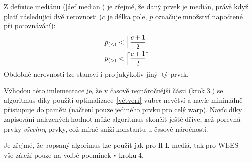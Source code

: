     Z definice mediánu (\ref{def median}) je zřejmé, že daný prvek je medián, právě když platí následující dvě nerovnosti ($c$ je délka pole, $p$ označuje množství napočtené při porovnávání):
    \begin{align}
      p_{(<)} < \Big\lfloor\frac{c+1}{2}\Big\rfloor \notag \\
      p_{(>)} < \Big\lceil\frac{c+1}{2}\Big\rceil \notag
    \end{align}
    Obdobné nerovnosti lze stanovi i pro jakýkoliv jiný \kk-tý prvek.

    Výhodou této imlementace je, že v časově nejnáročnější části (krok 3.) se algoritmus díky použití optimalizace~\ref{větvení} vůbec nevětví a navíc minimálně přistupuje do paměti (načtení pouze jediného prvku pro celý warp). Navíc díky zapisování nalezených hodnot může algoritmus skončit ještě dříve, než porovná prvky \emph{všechny} prvky, což mírně sníží konstantu u časové náročnosti.

    Je zřejmé, že popsaný algorimus lze použít jak pro H-L mediá, tak pro WBES -- vše záleží pouze na volbě podmínek v kroku 4.

